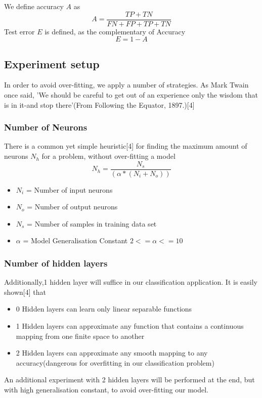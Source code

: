 \documentclass{proc}
\begin{document}
	We define accuracy $A$ as
	\[
		A={\frac {TP+TN}{FN+FP+TP+TN}}
	\]
	Test error $E$ is defined, as the complementary of Accuracy
	\[
		E = 1-A
	\]
	\subsection{Experiment setup}
	In order to avoid over-fitting, we apply a number of strategies. As Mark Twain once said, 'We should be careful to get out of an experience only the wisdom that is in it-and stop there'(From Following the Equator, 1897.)[4]
	\subsubsection{Number of Neurons}
	There is a common yet simple heuristic[4] for finding the maximum amount of neurons ${N_h}$ for a problem, without over-fitting a model
	\[
		N_h = \frac{N_s} {(\alpha * (N_i + N_o))}	
	\]
	\begin{itemize}
		\item $N_i$ = Number of input neurons
		\item $N_o$	= Number of output neurons
		\item $N_s$ = Number of samples in training data set
		\item $\alpha$ =   Model Generalisation Constant ${2<=\alpha<=10}$
	\end{itemize} 
	\subsubsection{Number of hidden layers}
	Additionally,1 hidden layer will suffice in our classification application. It is easily shown[4] that 
	
	\begin{itemize}
		\item 0 Hidden layers can learn only linear separable functions
		\item 1 Hidden layers can approximate any function that contains a continuous mapping from one finite space to another
		\item 2 Hidden layers can approximate any smooth mapping to any accuracy(dangerous for overfitting in our classification problem)
	\end{itemize} 
	
	An additional experiment with 2 hidden layers will be performed at the end, but with high generalisation constant, to avoid over-fitting our model.
	
\end{document}
